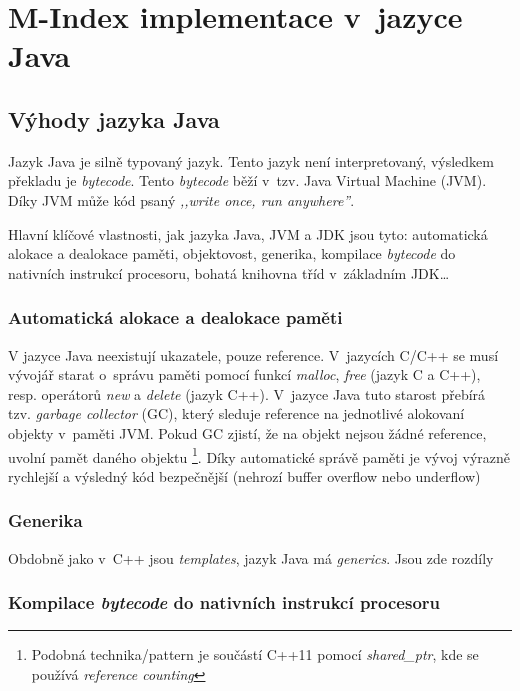 \chapter{M-Index implementace v~jazyce Java}


\section{Výhody jazyka Java}

Jazyk Java je silně typovaný jazyk\@. Tento jazyk není interpretovaný,
výsledkem překladu je \emph{bytecode}\@. Tento \emph{bytecode} běží
v~tzv. Java Virtual Machine (JVM)\@.
Díky JVM může kód psaný \emph{,,write once, run anywhere''}\@.

Hlavní klíčové vlastnosti, jak jazyka Java, JVM a JDK
jsou tyto: automatická alokace a dealokace paměti, objektovost, generika,
kompilace \emph{bytecode} do nativních instrukcí procesoru, bohatá
knihovna tříd v~základním JDK\ldots{}


\subsection{Automatická alokace a dealokace paměti}

V jazyce Java neexistují ukazatele, pouze reference. V~jazycích C/C++
se musí vývojář starat o~správu paměti pomocí funkcí \emph{malloc},
\emph{free} (jazyk C a C++), resp. operátorů \emph{new} a \emph{delete}
(jazyk C++)\@. V~jazyce Java tuto starost přebírá tzv. \emph{garbage
collector} (GC), který sleduje
reference na jednotlivé alokovaní objekty v~paměti JVM. Pokud GC
zjistí, že na objekt nejsou žádné reference, uvolní pamět daného objektu%
\footnote{Podobná technika/pattern je součástí C++11 pomocí \emph{shared\_ptr},
kde se používá \emph{reference counting}%
}\@. Díky automatické správě paměti je vývoj výrazně rychlejší a výsledný
kód bezpečnější (nehrozí buffer overflow nebo underflow)


\subsection{Generika}

Obdobně jako v~C++ jsou \emph{templates}, jazyk Java má \emph{generics}.
Jsou zde rozdíly


\subsection{Kompilace \emph{bytecode} do nativních instrukcí procesoru}

